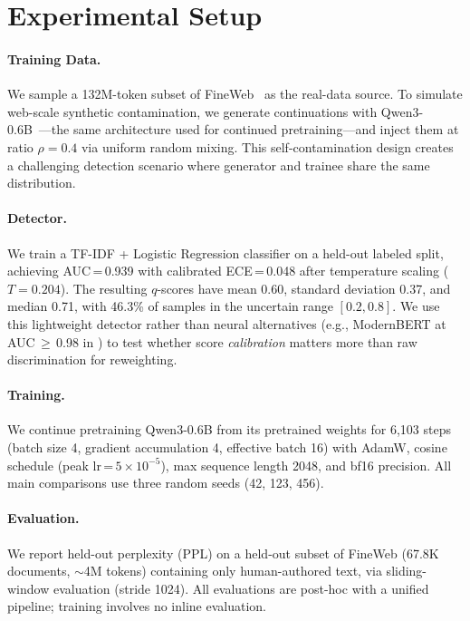 \section{Experimental Setup}
\label{sec:experiments}

\paragraph{Training Data.}
We sample a 132M-token subset of FineWeb~\citep{penedo_2024_fineweb} as the real-data source.
To simulate web-scale synthetic contamination, we generate continuations with Qwen3-0.6B~\citep{yang_2025_qwen3}---the same architecture used for continued pretraining---and inject them at ratio $\rho = 0.4$ via uniform random mixing.
This self-contamination design creates a challenging detection scenario where generator and trainee share the same distribution.

\paragraph{Detector.}
We train a TF-IDF + Logistic Regression classifier on a held-out labeled split, achieving AUC\,=\,0.939 with calibrated ECE\,=\,0.048 after temperature scaling ($T = 0.204$).
The resulting $q$-scores have mean 0.60, standard deviation 0.37, and median 0.71, with 46.3\% of samples in the uncertain range $[0.2, 0.8]$.
We use this lightweight detector rather than neural alternatives (e.g., ModernBERT at AUC\,${\geq}$\,0.98 in \citealt{drayson_2025_detection_collapse}) to test whether score \emph{calibration} matters more than raw discrimination for reweighting.

\paragraph{Training.}
We continue pretraining Qwen3-0.6B from its pretrained weights for 6{,}103 steps (batch size 4, gradient accumulation 4, effective batch 16) with AdamW, cosine schedule (peak lr\,=\,$5{\times}10^{-5}$), max sequence length 2048, and bf16 precision.
All main comparisons use three random seeds (42, 123, 456).

\paragraph{Evaluation.}
We report held-out perplexity (PPL) on a held-out subset of FineWeb (67.8K documents, $\sim$4M tokens) containing only human-authored text, via sliding-window evaluation (stride 1024).
All evaluations are post-hoc with a unified pipeline; training involves no inline evaluation.

